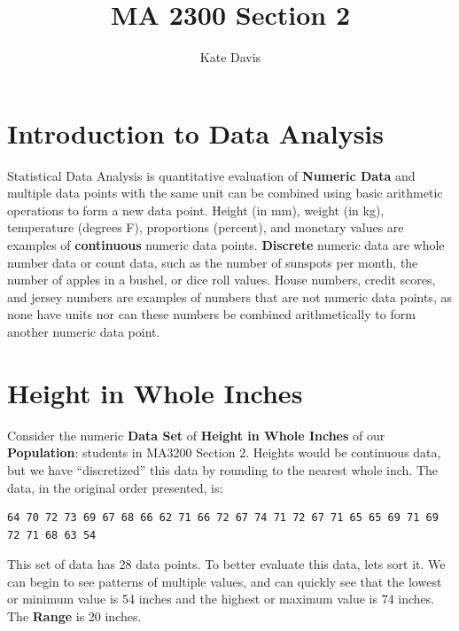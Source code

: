 \documentclass[nohyper,justified]{tufte-handout}\usepackage[]{graphicx}\usepackage[]{color}
\title{MA 2300 Section 2}
\author{Kate Davis}
\makeatletter
\newenvironment{kframe}{%
 \def\at@end@of@kframe{}%
 \ifinner\ifhmode%
  \def\at@end@of@kframe{\end{minipage}}%
  \begin{minipage}{\columnwidth}%
 \fi\fi%
 \def\FrameCommand##1{\hskip\@totalleftmargin \hskip-\fboxsep
 \colorbox{shadecolor}{##1}\hskip-\fboxsep
     \hskip-\linewidth \hskip-\@totalleftmargin \hskip\columnwidth}%
 \MakeFramed {\advance\hsize-\width
   \@totalleftmargin\z@ \linewidth\hsize
   \@setminipage}}%
 {\par\unskip\endMakeFramed%
 \at@end@of@kframe}
\newenvironment{knitrout}{}{} %
\makeatother
\begin{document}
\maketitle
\section{Introduction to Data Analysis}
Statistical Data Analysis is quantitative evaluation of \textbf{Numeric Data} and multiple data points with the same unit can be combined using basic arithmetic operations to form a new data point. Height (in mm), weight (in kg), temperature (degrees F), proportions (percent), and monetary values are examples of  \textbf{continuous} numeric data points. \textbf{Discrete} numeric data are whole number data or count data, such as the number of sunspots per month, the number of apples in a bushel, or dice roll values.  House numbers, credit scores, and jersey numbers are examples of numbers that are not numeric data points, as none have units nor can these numbers be combined arithmetically to form another numeric data point.

\section{Height in Whole Inches}
Consider the numeric \textbf{Data Set} of \textbf{Height in Whole Inches} of our \textbf{Population}: students in MA3200 Section 2. Heights would be continuous data, but we have ``discretized'' this data by rounding to the nearest whole inch. The data, in the original order presented, is:

\begin{knitrout}
\color{fgcolor}\begin{kframe}
\begin{verbatim}
64 70 72 73 69 67 68 66 62 71 66 72 67 74 71 72 67 71 65 65 69 71 69 72 71 68 63 54
\end{verbatim}
\end{kframe}
\end{knitrout}
This set of data has 28 data points. To better evaluate this data, lets sort it. We can begin to see patterns of multiple values, and can quickly see that the lowest or minimum value is 54 inches and the highest or maximum value is 74 inches. The \textbf{Range} is 20 inches.
\end{document}
